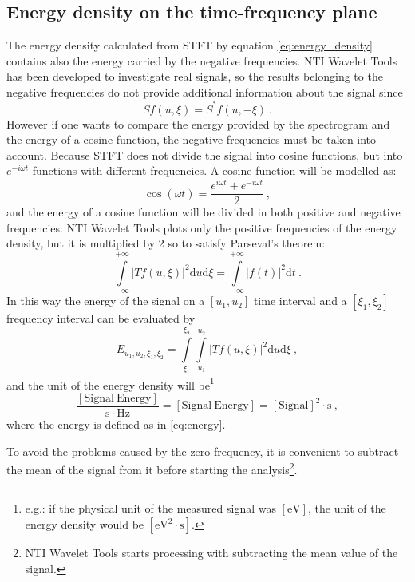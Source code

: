 \documentclass[a4paper,12pt,oneside]{article}
\newcommand{\dt}{\mathrm{d}t}
\newcommand{\du}{\mathrm{d}u}
\newcommand{\dxi}{\mathrm{d}\xi}
\newcommand{\conj}{^{\textstyle^*}}
\begin{document}
\subsection{Energy density on the time-frequency plane}

The energy density calculated from STFT by equation \eqref{eq:energy_density} contains also the energy carried by the negative frequencies. NTI Wavelet Tools has been developed to investigate real signals, so the results belonging to the negative frequencies do not provide additional information about the signal since
\begin{equation}\label{negative_freq}
  S f(u,\xi) = S\conj f(u,-\xi) \ .
\end{equation}
However if one wants to compare the energy provided by the spectrogram and the energy of a cosine function, the negative frequencies must be taken into account. Because STFT does not divide the signal into cosine functions, but into $e^{-i \omega t}$ functions with different frequencies. A cosine function will be modelled as:
\begin{equation}\label{eq:cosine}
  \cos(\omega t) = \dfrac{e^{i\omega t} + e^{-i\omega t}}{2} \ ,
\end{equation}
and the energy of a cosine function will be divided in both positive and negative frequencies. NTI Wavelet Tools plots only the positive frequencies of the energy density, but it is multiplied by 2 so to satisfy Parseval's theorem:
\begin{equation}\label{eq:parseval}
  \int\limits_{-\infty}^{+\infty}  |T f(u,\xi)|^2 \du \dxi = \int\limits_{-\infty}^{+\infty}  |f(t)|^2 \dt \ .
\end{equation}
In this way the energy of the signal on a $[u_1, u_2]$ time interval and a $[\xi_1, \xi_2]$ frequency interval can be evaluated by
\begin{equation}\label{eq:energy_interval}
  E_{u_1, u_2, \xi_1, \xi_2} = \int\limits_{\xi_1}^{\xi_2} \int\limits_{u_1}^{u_2} |T f(u,\xi)|^2 \du \dxi \ ,
\end{equation}
and the unit of the energy density will be\footnote{e.g.: if the physical unit of the measured signal was $[\mathrm{eV}]$, the unit of the energy density would be $[\mathrm{eV}^2 \cdot \mathrm{s}]$.}
$$\dfrac{[\mathrm{Signal\ Energy}]}{\mathrm{s}\cdot\mathrm{Hz}} = [\mathrm{Signal\ Energy}] = [\mathrm{Signal}]^2\cdot \mathrm{s} \ ,$$ where the energy is defined as in \eqref{eq:energy}.

To avoid the problems caused by the zero frequency, it is convenient to subtract the mean of the signal from it before starting the analysis\footnote{NTI Wavelet Tools starts processing with subtracting the mean value of the signal.}.
\end{document}
